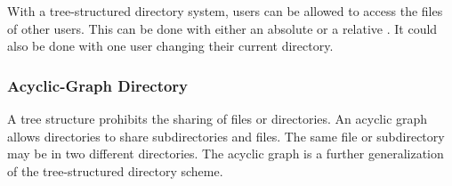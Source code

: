 With a tree-structured directory system, users can be allowed to access the files of other users.
This can be done with either an absolute or a relative .
It could also be done with one user changing their current directory.

\subsubsection{Acyclic-Graph Directory}\label{subsubsec:Acyclic_Graph_Directory}
A tree structure prohibits the sharing of files or directories.
An acyclic graph allows directories to share subdirectories and files.
The same file or subdirectory may be in two different directories.
The acyclic graph is a further generalization of the tree-structured directory scheme.


